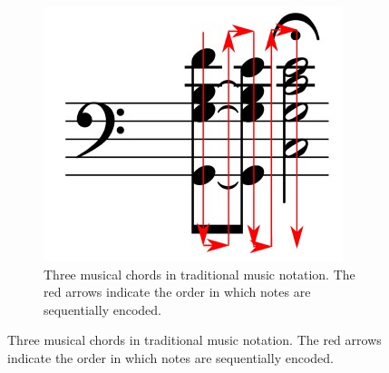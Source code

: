 \documentclass[12pt]{report}
\begin{document}
\begin{figure}[h]
    \centering
    \newlength{\MyOtherHeightTwo}
    \begin{subfigure}[t]{0.28\textwidth}
        \centering
        \includegraphics[width=.9 \textwidth]{images/related_works/bachbot/bachbot_encoding_stave.jpg}
        \caption{ {Three musical chords in traditional music notation. The red arrows indicate the order in which notes are sequentially encoded.}}
        \label{fig:relatedwork_bachbot_stave}
    \end{subfigure}

\end{figure}
\end{document}
